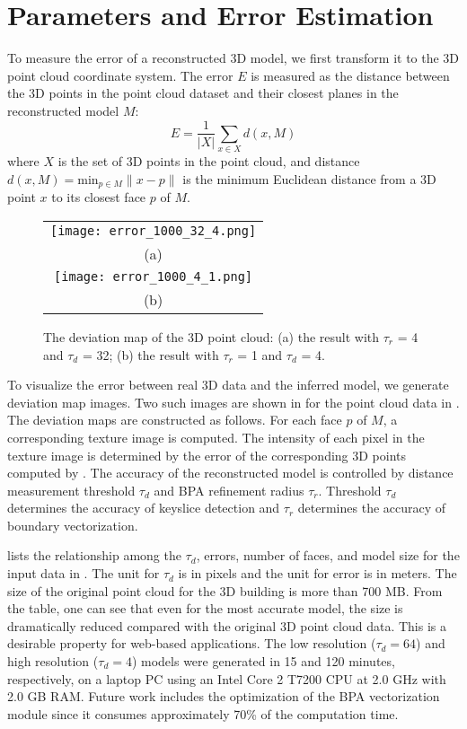 \section{Parameters and Error Estimation}
\label{sec:pf_ee}

To measure the error of a reconstructed 3D model,
we first transform it to the 3D point cloud coordinate system.
The error $E$ is measured as the distance
between the 3D points in the point cloud dataset
and their closest planes in the reconstructed model $M$:
\begin{equation}
E = \frac{1}{|X|}\sum_{x\in{X}}{d(x, M)}
\label{eq:em}
\end{equation}
where $X$ is the set of 3D points in the point cloud,
and distance $d(x, M) = \text{min}_{p \in M}\lVert x - p \lVert$
is the minimum Euclidean distance from a 3D point $x$
to its closest face $p$ of $M$.

\begin{figure} [htbp]
\begin{center}
\begin{tabular}{c}
\texttt{[image: error\_1000\_32\_4.png]} \\
(a) \\
\texttt{[image: error\_1000\_4\_1.png]} \\
(b)
\end{tabular}
\end{center}
\caption{The deviation map of the 3D point cloud:
(a) the result with $\tau_r$ = 4 and $\tau_d$ = 32;
(b) the result with $\tau_r$ = 1 and $\tau_d$ = 4. }
\label{fig:EM}
\end{figure}

To visualize the error between real 3D data and the inferred model,
we generate deviation map images.
Two such images are shown in  for the point cloud data in
.
The deviation maps are constructed as follows.
For each face $p$ of $M$, a corresponding texture image is computed.
The intensity of each pixel in the texture image is determined
by the error of the corresponding 3D points computed by .
The accuracy of the reconstructed model is controlled by
distance measurement threshold $\tau_d$ and BPA refinement radius $\tau_r$.
Threshold $\tau_d$ determines the accuracy of keyslice detection
and $\tau_r$ determines the accuracy of boundary vectorization.

 lists the relationship among the $\tau_d$, errors,
number of faces, and model size for the input data in .
The unit for $\tau_d$ is in pixels and the unit for error is in meters.
The size of the original point cloud for the 3D building is more than 700 MB.
From the table, one can see that even for the most accurate model,
the size is dramatically reduced compared with the original 3D point cloud data.
This is a desirable property for web-based applications.
The low resolution ($\tau_d = 64$) and high resolution ($\tau_d = 4$) models
were generated in 15 and 120 minutes, respectively,
on a laptop PC using an Intel Core 2 T7200 CPU at 2.0 GHz with 2.0 GB RAM.
Future work includes the optimization of the BPA vectorization module since
it consumes approximately 70\% of the computation time.

